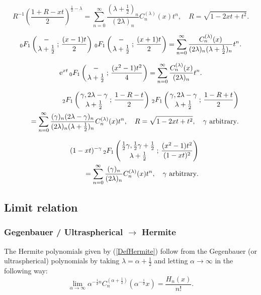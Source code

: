 \documentclass[envcountchap,graybox]{svmono}
\newcounter{rom}
\newcommand{\hyp}[5]{\mbox{}_{#1}{F}_{#2}
\left(\genfrac{}{}{0pt}{}{#3}{#4}\,;\,#5\right)}
\newcommand{\e}{\textrm{e}}
\begin{document}
\begin{equation}
\label{GenGegenbauer2}
R^{-1}\left(\frac{1+R-xt}{2}\right)^{\frac{1}{2}-\lambda}=\sum_{n=0}^{\infty}
\frac{(\lambda+\frac{1}{2})_n}{(2\lambda)_n}C_n^{(\lambda)}(x)t^n,
\quad R=\sqrt{1-2xt+t^2}.
\end{equation}

\begin{equation}
\label{GenGegenbauer3}
\hyp{0}{1}{-}{\lambda+\frac{1}{2}}{\frac{(x-1)t}{2}}\,
\hyp{0}{1}{-}{\lambda+\frac{1}{2}}{\frac{(x+1)t}{2}}
=\sum_{n=0}^{\infty}\frac{C_n^{(\lambda)}(x)}
{(2\lambda)_n(\lambda+\frac{1}{2})_n}t^n.
\end{equation}

\begin{equation}
\label{GenGegenbauer4}
\e^{xt}\,\hyp{0}{1}{-}{\lambda+\frac{1}{2}}{\frac{(x^2-1)t^2}{4}}=
\sum_{n=0}^{\infty}\frac{C_n^{(\lambda)}(x)}{(2\lambda)_n}t^n.
\end{equation}

\begin{eqnarray}
\label{GenGegenbauer5}
& &\hyp{2}{1}{\gamma,2\lambda-\gamma}{\lambda+\frac{1}{2}}{\frac{1-R-t}{2}}\,
\hyp{2}{1}{\gamma,2\lambda-\gamma}{\lambda+\frac{1}{2}}{\frac{1-R+t}{2}}\nonumber\\
& &{}=\sum_{n=0}^{\infty}\frac{(\gamma)_n(2\lambda-\gamma)_n}
{(2\lambda)_n(\lambda+\frac{1}{2})_n}C_n^{(\lambda)}(x)t^n,
\quad R=\sqrt{1-2xt+t^2},\quad\textrm{$\gamma$ arbitrary}.
\end{eqnarray}

\begin{eqnarray}
\label{GenGegenbauer6}
& &(1-xt)^{-\gamma}\,\hyp{2}{1}{\frac{1}{2}\gamma,\frac{1}{2}\gamma+\frac{1}{2}}
{\lambda+\frac{1}{2}}{\frac{(x^2-1)t^2}{(1-xt)^2}}\nonumber\\
& &{}=\sum_{n=0}^{\infty}\frac{(\gamma)_n}{(2\lambda)_n}C_n^{(\lambda)}(x)t^n,
\quad\textrm{$\gamma$ arbitrary}.
\end{eqnarray}

\subsection*{Limit relation}

\subsubsection*{Gegenbauer / Ultraspherical $\rightarrow$ Hermite}
The Hermite polynomials given by (\ref{DefHermite}) follow from the Gegenbauer (or
ultraspherical) polynomials by taking $\lambda=\alpha+\frac{1}{2}$ and letting
$\alpha\rightarrow\infty$ in the following way:
\begin{equation}
\lim_{\alpha\rightarrow\infty}
\alpha^{-\frac{1}{2}n}C_n^{(\alpha+\frac{1}{2})}(\alpha^{-\frac{1}{2}}x)=\frac{H_n(x)}{n!}.
\end{equation}
\end{document}
